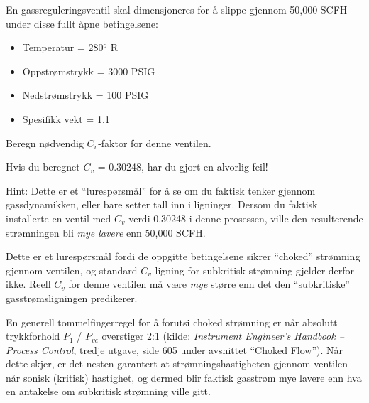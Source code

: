

En gassreguleringsventil skal dimensjoneres for å slippe gjennom 50,000 SCFH under disse fullt åpne betingelsene:

\begin{itemize}
\item{}Temperatur = 280$^{o}$ R
\item{}Oppstrømstrykk = 3000 PSIG
\item{}Nedstrømstrykk = 100 PSIG
\item{}Spesifikk vekt = 1.1
\end{itemize} 
 
Beregn nødvendig $C_{v}$-faktor for denne ventilen.
 






Hvis du beregnet $C_{v}$ = 0.30248, har du gjort en alvorlig feil!
 
\vskip 10pt

Hint: Dette er et ``lurespørsmål'' for å se om du faktisk tenker gjennom gassdynamikken, eller bare setter tall inn i ligninger. Dersom du faktisk installerte en ventil med $C_{v}$-verdi 0.30248 i denne prosessen, ville den resulterende strømningen bli {\it mye lavere} enn 50,000 SCFH.







Dette er et lurespørsmål fordi de oppgitte betingelsene sikrer ``choked'' strømning gjennom ventilen, og standard $C_{v}$-ligning for subkritisk strømning gjelder derfor ikke. Reell $C_{v}$ for denne ventilen må være {\it mye} større enn det den ``subkritiske'' gasstrømsligningen predikerer.

En generell tommelfingerregel for å forutsi choked strømning er når absolutt trykkforhold $P_1$ / $P_{vc}$ overstiger 2:1 (kilde: {\it Instrument Engineer's Handbook -- Process Control}, tredje utgave, side 605 under avsnittet ``Choked Flow''). Når dette skjer, er det nesten garantert at strømningshastigheten gjennom ventilen når sonisk (kritisk) hastighet, og dermed blir faktisk gasstrøm mye lavere enn hva en antakelse om subkritisk strømning ville gitt.

